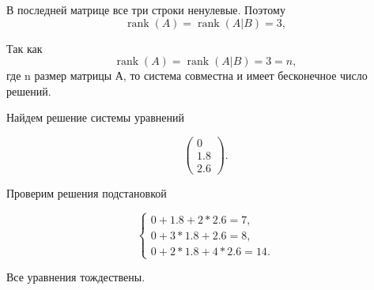 \documentclass[12pt,a4paper]{article}
\begin{document}
В последней матрице все три строки ненулевые. Поэтому
\[
\operatorname{rank}(A)=\operatorname{rank}(A|B)=3,
\]

Так как
\[
\operatorname{rank}(A)=\operatorname{rank}(A|B)=3=n,
\]
где n размер матрицы А, то система совместна и имеет бесконечное число решений.

Найдем решение системы уравнений

\[
\left(
\begin{array}{c}
0\\
1.8\\
2.6
\end{array}
\right).
\]

Проверим решения подстановкой

\[
\begin{cases}
0 + 1.8 + 2 * 2.6 = 7, \\
0 + 3 * 1.8 + 2.6 = 8, \\
0 + 2 * 1.8 + 4 * 2.6 = 14.
\end{cases}
\]

Все уравнения тождествены.
\end{document}
